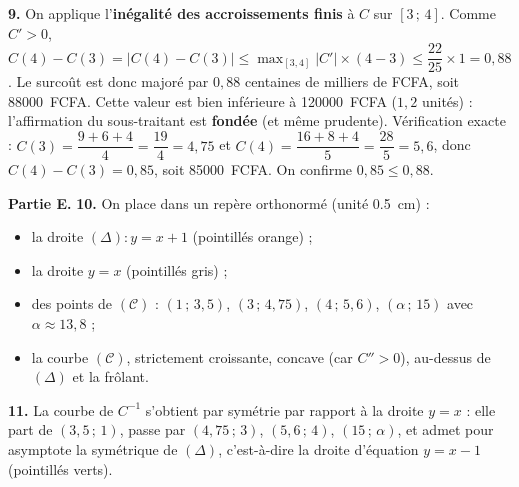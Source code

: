 \documentclass[11pt]{article}
\begin{document}
\begin{exoresolu}
\textbf{9.} On applique l'\textbf{inégalité des accroissements finis} à $C$ sur $[3\,;\,4]$. Comme $C'>0$, $C(4)-C(3) = |C(4)-C(3)| \leq \max_{[3,4]}|C'| \times (4-3) \leq \dfrac{22}{25}\times 1 = 0{,}88$.
Le surcoût est donc majoré par $0{,}88$ centaines de milliers de FCFA, soit \num{88000}~FCFA. Cette valeur est bien inférieure à \num{120000}~FCFA ($1{,}2$ unités) : l'affirmation du sous-traitant est \textbf{fondée} (et même prudente).
Vérification exacte : $C(3)=\dfrac{9+6+4}{4}=\dfrac{19}{4}=4{,}75$ et $C(4)=\dfrac{16+8+4}{5}=\dfrac{28}{5}=5{,}6$, donc $C(4)-C(3)=0{,}85$, soit \num{85000}~FCFA. On confirme $0{,}85 \leq 0{,}88$.

\textbf{Partie E.} \textbf{10.} On place dans un repère orthonormé (unité \SI{0,5}{cm}) :
\begin{itemize}
\item la droite $(\Delta): y=x+1$ (pointillés orange) ;
\item la droite $y=x$ (pointillés gris) ;
\item des points de $(\mathcal{C})$ : $(1\,;\,3{,}5)$, $(3\,;\,4{,}75)$, $(4\,;\,5{,}6)$, $(\alpha\,;\,15)$ avec $\alpha\approx 13{,}8$ ;
\item la courbe $(\mathcal{C})$, strictement croissante, concave (car $C''>0$), au-dessus de $(\Delta)$ et la frôlant.
\end{itemize}

\textbf{11.} La courbe de $C^{-1}$ s'obtient par symétrie par rapport à la droite $y=x$ : elle part de $(3{,}5\,;\,1)$, passe par $(4{,}75\,;\,3)$, $(5{,}6\,;\,4)$, $(15\,;\,\alpha)$, et admet pour asymptote la symétrique de $(\Delta)$, c'est-à-dire la droite d'équation $y=x-1$ (pointillés verts).
\end{exoresolu}
\end{document}
